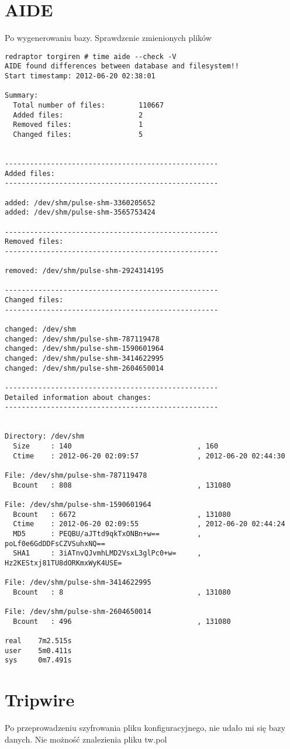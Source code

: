 \documentclass[a4paper,12pt]{article}
\begin{document}
\section{AIDE}
Po wygenerowaniu bazy. Sprawdzenie zmienionych plików
\small
\begin{verbatim}
redraptor torgiren # time aide --check -V
AIDE found differences between database and filesystem!!
Start timestamp: 2012-06-20 02:38:01

Summary:
  Total number of files:        110667
  Added files:                  2
  Removed files:                1
  Changed files:                5


---------------------------------------------------
Added files:
---------------------------------------------------

added: /dev/shm/pulse-shm-3360205652
added: /dev/shm/pulse-shm-3565753424

---------------------------------------------------
Removed files:
---------------------------------------------------

removed: /dev/shm/pulse-shm-2924314195

---------------------------------------------------
Changed files:
---------------------------------------------------

changed: /dev/shm
changed: /dev/shm/pulse-shm-787119478
changed: /dev/shm/pulse-shm-1590601964
changed: /dev/shm/pulse-shm-3414622995
changed: /dev/shm/pulse-shm-2604650014

---------------------------------------------------
Detailed information about changes:
---------------------------------------------------


Directory: /dev/shm
  Size     : 140                              , 160
  Ctime    : 2012-06-20 02:09:57              , 2012-06-20 02:44:30

File: /dev/shm/pulse-shm-787119478
  Bcount   : 808                              , 131080

File: /dev/shm/pulse-shm-1590601964
  Bcount   : 6672                             , 131080
  Ctime    : 2012-06-20 02:09:55              , 2012-06-20 02:44:24
  MD5      : PEQBU/aJTtd9qkTxONBn+w==         , poLf0e6GdDDFsCZVSuhxNQ==
  SHA1     : 3iATnvQJvmhLMD2VsxL3glPc0+w=     , Hz2KEStxj81TU8dORKmxWyK4USE=

File: /dev/shm/pulse-shm-3414622995
  Bcount   : 8                                , 131080

File: /dev/shm/pulse-shm-2604650014
  Bcount   : 496                              , 131080

real    7m2.515s
user    5m0.411s
sys     0m7.491s
\end{verbatim}
\normalsize
\section{Tripwire}
Po przeprowadzeniu szyfrowania pliku konfiguracyjnego, nie udało mi się bazy danych. Nie możność znalezienia pliku tw.pol
\end{document}
